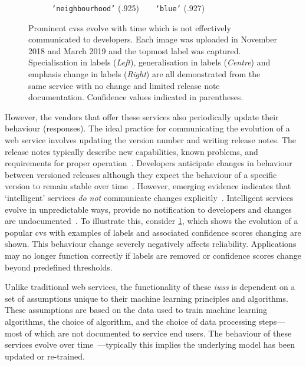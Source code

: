 {\begin{landscape}
\begin{figure}[th]
\begin{subfigure}{.3\linewidth}
        \caption{\texttt{`neighbourhood'} (.925)~~\ra{}~~\texttt{`blue'} (.927)}
    \end{subfigure}
    \caption{Prominent \glspl{cvs} evolve with time which is not effectively communicated to developers. Each image was uploaded in November 2018 and March 2019 and the topmost label was captured. Specialisation in labels (\textit{Left}), generalisation in labels (\textit{Centre}) and emphasis change in labels (\textit{Right}) are all demonstrated from the same service with no  change and limited release note documentation. Confidence values indicated in parentheses.}
    \label{fig:labelchanges}
\end{figure}
\end{landscape}}

However, the vendors that offer these services also periodically update their behaviour (responses). The ideal practice for communicating the evolution of a web service involves updating the version number and writing release notes. The release notes typically describe new capabilities, known problems, and requirements for proper operation~\citep{SWEBOK}. Developers anticipate changes in behaviour between versioned releases although they expect the behaviour of a specific version to remain stable over time~\citep{vasa2010growth}. However, emerging evidence indicates that `intelligent' services \textit{do not} communicate changes explicitly~\citep{Cummaudo:2019esem}. Intelligent services evolve in unpredictable ways, provide no notification to developers and changes are undocumented~\citep{Cummaudo:2020icse}. To illustrate this, consider \cref{fig:labelchanges}, which shows the evolution of a popular \gls{cvs} with examples of labels and associated confidence scores changing are shown. This behaviour change severely negatively affects reliability. Applications may no longer function correctly if labels are removed or confidence scores change beyond predefined thresholds. 

Unlike traditional web services, the functionality of these \textit{\glspl{iws}} is dependent on a set of assumptions unique to their machine learning principles and algorithms. These assumptions are based on the data used to train machine learning algorithms, the choice of algorithm, and the choice of data processing steps---most of which are not documented to service end users. The behaviour of these services evolve over time~\citep{Cummaudo:2019icsme}---typically this  implies the underlying model has been updated or re-trained. 

